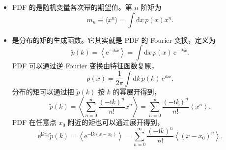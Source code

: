 \begin{itemize}[itemsep=0.45em,topsep=0.4em]
  \item PDF 的是随机变量各次幂的期望值。第 $n$ 阶矩为
  \begin{equation}\label{eq:2.4}
    m_n\equiv\langle x^n\rangle=\int\mathrm{d}x\,p(x)x^n.
  \end{equation}

  \item {}是分布的矩的生成函数。它其实就是 PDF 的 Fourier 变换，定义为
  \begin{equation}\label{eq:2.5}
    \tilde p(k)=\left\langle \mathrm{e}^{-\mathrm{i}kx}\right\rangle=\int\mathrm{d}x\,p(x)\,\mathrm{e}^{-\mathrm{i}kx}.
  \end{equation}
  PDF 可以通过逆 Fourier 变换由特征函数复原，
  \begin{equation}\label{eq:2.6}
    p(x)=\frac{1}{2\pi}\int\mathrm{d}k\,\tilde p(k)\,\mathrm{e}^{\mathrm{i}kx}.
  \end{equation}
  分布的矩可以通过把 $\tilde p(k)$ 按 $k$ 的幂展开得到，
  \begin{equation}\label{eq:2.7}
    \tilde p(k)=\left\langle\sum_{n=0}^{\infty}\frac{(-\mathrm{i}k)^n}{n!}x^n\right\rangle=\sum_{n=0}^{\infty}\frac{(-\mathrm{i}k)^n}{n!}\left\langle x^n\right\rangle.
  \end{equation}
  PDF 在任意点 $x_0$ 附近的矩也可以通过展开得到，
  \begin{equation}\label{eq:2.8}
    \mathrm{e}^{\mathrm{i}kx_0}\tilde p(k)=\left\langle \mathrm{e}^{-\mathrm{i}k(x-x_0)}\right\rangle=\sum_{n=0}^{\infty}\frac{(-\mathrm{i}k)^n}{n!}\left\langle (x-x_0)^n\right\rangle.
  \end{equation}


\end{itemize}
